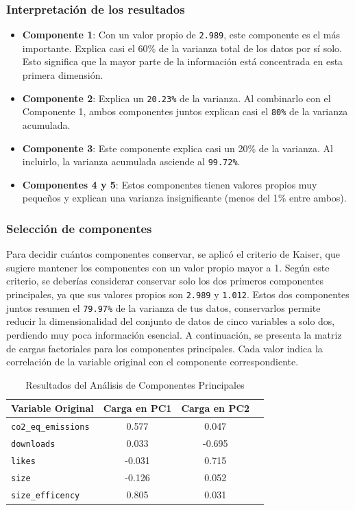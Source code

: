 \documentclass[journal]{IEEEtran}
\begin{document}
	\subsubsection{Interpretación de los resultados}
	\begin{itemize}
		\item \textbf{Componente 1}: Con un valor propio de \texttt{2.989}, este componente es el más importante. Explica casi el 60\% de la varianza total de los datos por sí solo. Esto significa que la mayor parte de la información está concentrada en esta primera dimensión.
		\item \textbf{Componente 2}: Explica un \texttt{20.23\%} de la varianza. Al combinarlo con el Componente 1, ambos componentes juntos explican casi el \texttt{80\%} de la varianza acumulada.
		\item \textbf{Componente 3}: Este componente explica casi un 20\% de la varianza. Al incluirlo, la varianza acumulada asciende al \texttt{99.72\%}.
		\item \textbf{Componentes 4 y 5}: Estos componentes tienen valores propios muy pequeños y explican una varianza insignificante (menos del 1\% entre ambos).
	\end{itemize}
	\subsubsection{Selección de componentes}
	Para decidir cuántos componentes conservar, se aplicó el criterio de  Kaiser, que sugiere mantener los componentes con un valor propio mayor a 1.
	Según este criterio, se deberías considerar conservar solo los dos primeros componentes principales, ya que sus valores propios son \texttt{2.989} y \texttt{1.012}.
	Estos dos componentes juntos resumen el \texttt{79.97\%} de la varianza de tus datos, conservarlos permite reducir la dimensionalidad del conjunto de datos de cinco variables a solo dos, perdiendo muy poca información esencial.
	A continuación, se presenta la matriz de cargas factoriales para los componentes principales. Cada valor indica la correlación de la variable original con el componente correspondiente.
	
	\begin{table}[H]
		\centering
		\caption{Resultados del Análisis de Componentes Principales}
		\begin{tabular}{l c c c}
			\toprule
			Variable Original & Carga en PC1 & Carga en PC2 \\
			\midrule
			\texttt{co2\_eq\_emissions} & 0.577 & 0.047 \\
			\texttt{downloads} & 0.033 & -0.695 \\
			\texttt{likes} & -0.031 & 0.715 \\
			\texttt{size} & -0.126 & 0.052 \\
			\texttt{size\_efficency} & 0.805 & 0.031 \\
			\bottomrule
		\end{tabular}
		\label{tab:pca_results}
	\end{table}
	
\end{document}
